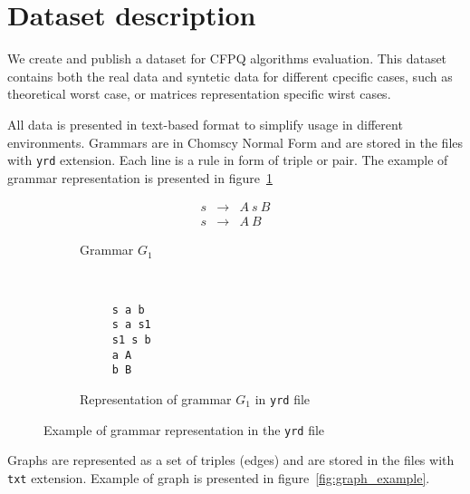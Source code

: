 \section{Dataset description}

We create and publish a dataset for CFPQ algorithms evaluation.
This dataset contains both the real data and syntetic data for different cpecific cases, such as theoretical worst case, or matrices representation specific wirst cases.

All data is presented in text-based format to simplify usage in different environments.
Grammars are in Chomscy Normal Form and are stored in the files with \verb|yrd| extension.
Each line is a rule in form of triple or pair. 
The example of grammar representation is presented in figure~\ref{fig:grammar_example}


\begin{figure}[h]
    \centering
    \begin{subfigure}[b]{0.24\textwidth}
        \centering
        \[
         \begin{array}{rcl}
           s & \rightarrow & A \ s \ B \\
           s & \rightarrow & A \ B 
         \end{array}        
         \]
        \caption{Grammar $G_1$}
    \end{subfigure}%
    ~ 
    \begin{subfigure}[b]{0.24\textwidth}
        \centering
        \begin{verbatim}
     s a b
     s a s1
     s1 s b
     a A
     b B
        \end{verbatim}
        \caption{Representation of grammar $G_1$ in \texttt{yrd} file}
    \end{subfigure}
    \caption{Example of grammar representation in the \texttt{yrd} file}
    \label{fig:grammar_example}
\end{figure}



Graphs are represented as a set of triples (edges) and are stored in the files with \verb|txt| extension. 
Example of graph is presented in figure~\ref{fig:graph_example}.

